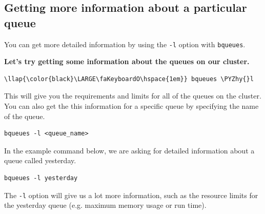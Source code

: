 \documentclass[11pt]{article}
\def\PYZhy{\char`\-}
\begin{document}
    \subsection{Getting more information about a particular
queue}\label{getting-more-information-about-a-particular-queue}

You can get more detailed information by using the \texttt{-l} option
with \texttt{bqueues}.

\textbf{Let's try getting some information about the queues on our
cluster.}

\begin{terminalinput}
\begin{Verbatim}[commandchars=\\\{\}]
\llap{\color{black}\LARGE\faKeyboardO\hspace{1em}} bqueues \PYZhy{}l
\end{Verbatim}
\end{terminalinput}


    This will give you the requirements and limits for all of the queues on
the cluster. You can also get the this information for a specific queue
by specifying the name of the queue.

\begin{verbatim}
bqueues -l <queue_name>
\end{verbatim}

In the example command below, we are asking for detailed information
about a queue called yesterday.

    \begin{verbatim}
bqueues -l yesterday
\end{verbatim}

    The \texttt{-l} option will give us a lot more information, such as the
resource limits for the yesterday queue (e.g. maximum memory usage or
run time).
\end{document}
